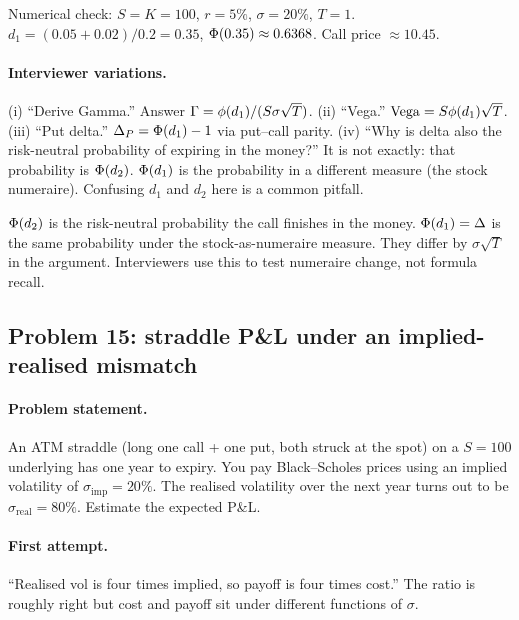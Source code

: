 Numerical check: $S = K = 100$, $r = 5\%$, $\sigma = 20\%$,
$T = 1$.  $d_1 = (0.05 + 0.02)/0.2 = 0.35$,
$\Phi(0.35) \approx 0.6368$.  Call price $\approx 10.45$.

\paragraph{Interviewer variations.}
(i) ``Derive Gamma.''  Answer $\Gamma = \phi(d_1)/(S \sigma
\sqrt T)$.  (ii) ``Vega.''  $\mathrm{Vega} = S \phi(d_1)
\sqrt T$.  (iii) ``Put delta.''  $\Delta_P = \Phi(d_1) - 1$
via put--call parity.  (iv) ``Why is delta also the risk-neutral
probability of expiring in the money?''  It is not exactly:
that probability is $\Phi(d_2)$.  $\Phi(d_1)$ is the probability in a
different measure (the stock numeraire).  Confusing $d_1$ and
$d_2$ here is a common pitfall.

\begin{pitfallbox}[title={Delta is not exercise probability}]
$\Phi(d_2)$ is the risk-neutral probability the call finishes
in the money.  $\Phi(d_1) = \Delta$ is the same probability under
the stock-as-numeraire measure.  They differ by $\sigma \sqrt T$
in the argument.  Interviewers use this to test numeraire change,
not formula recall.
\end{pitfallbox}

\subsection{Problem 15: straddle P\&L under an implied-realised mismatch}
\label{sec:straddle}

\paragraph{Problem statement.}
An ATM straddle (long one call + one put, both struck at the spot)
on a $S = 100$ underlying has one year to expiry.  You pay
Black--Scholes prices using an implied volatility of $\sigma_{\mathrm{imp}}
= 20\%$.  The realised volatility over the next year turns out to
be $\sigma_{\mathrm{real}} = 80\%$.  Estimate the expected P\&L.

\paragraph{First attempt.}
``Realised vol is four times implied, so payoff is four times
cost.''  The ratio is roughly right but cost and payoff sit under
different functions of $\sigma$.

